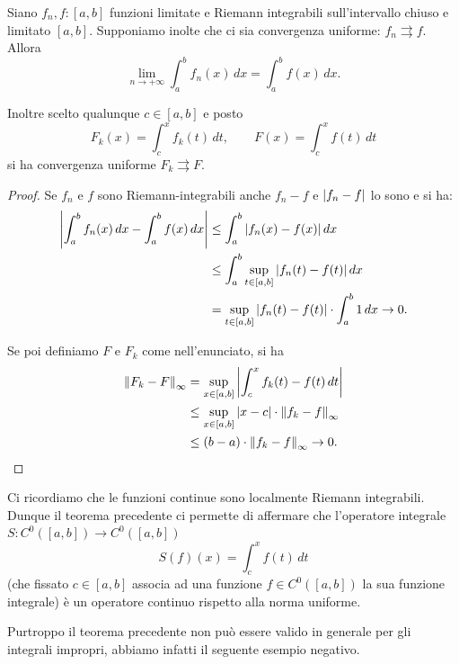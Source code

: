 \begin{theorem}%
  \label{th:scambio_limite_integrale}%
  \mymark{***}%
  Siano $f_n,f\colon [a,b]$ funzioni limitate 
  e Riemann integrabili sull'intervallo chiuso e limitato $[a,b]$.
  Supponiamo inolte che ci sia convergenza uniforme: 
  $f_n \rightrightarrows f$.
  Allora 
  \[
      \lim_{n\to+\infty} \int_a^b f_n(x)\, dx 
      = \int_a^b f(x)\, dx.
  \]

  Inoltre scelto qualunque $c\in [a,b]$ e posto
  \[
    F_k(x) = \int_{c}^x f_k(t)\, dt,
    \qquad
    F(x) = \int_{c}^x f(t)\, dt
  \]
  si ha convergenza uniforme $F_k \rightrightarrows F$.
\end{theorem}
\begin{proof}
  Se $f_n$ e $f$ sono Riemann-integrabili anche $f_n-f$ e ${\left|f_n-f\right|}$ lo sono 
  e si ha:
  \begin{align*}
    {\left|\int_a^b f_n(x)\, dx - \int_a^b f(x)\, dx\right|}
    &\le \int_a^b {\left|f_n(x)-f(x)\right|}\, dx \\
    &\le \int_a^b \sup_{t\in[a,b]} {\left|f_n(t)-f(t)\right|}\, dx \\
    &= \sup_{t\in [a,b]}{\left|f_n(t)-f(t)\right|}\cdot \int_a^b 1\, dx
    \to 0.
  \end{align*}

  Se poi definiamo $F$ e $F_k$ come nell'enunciato, si ha
  \begin{align*}
  {\left\Vert F_k-F\right\Vert}_\infty
  &= \sup_{x\in [a,b]} {\left|\int_c^x f_k(t)-f(t)\, dt\right|} \\
  &\le \sup_{x\in [a,b]} {\left|x-c\right|} \cdot {\left\Vert f_k-f\right\Vert}_\infty \\
  &\le (b-a) \cdot {\left\Vert f_k-f\right\Vert}_\infty
  \to 0.
  \end{align*}
\end{proof}
  
Ci ricordiamo che le funzioni continue sono localmente Riemann integrabili.
Dunque il teorema precedente ci permette di affermare che l'operatore integrale 
$S\colon C^0([a,b]) \to C^0([a,b])$
\[
S(f)(x) = \int_{c}^x f(t)\, dt
\]
(che fissato $c \in [a,b]$ associa ad una funzione $f\in C^0([a,b])$ la sua funzione integrale) 
è un operatore continuo rispetto alla norma uniforme.

Purtroppo il teorema precedente non può essere valido in generale per gli integrali impropri,
abbiamo infatti il seguente esempio negativo.


